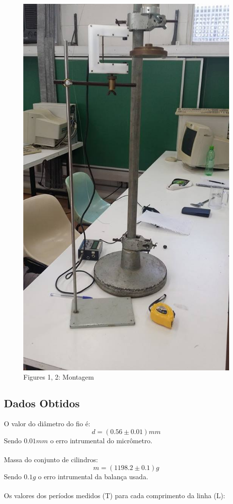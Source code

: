 \documentclass[12pt,a4paper]{article}
\begin{document}
\begin{figure}[!htbp]
	\includegraphics[scale=0.30]{02.jpg}\\
	Figures 1, 2: Montagem
\end{figure}

\subsection{Dados Obtidos}
O valor do diâmetro do fio é:
$$ d = (0.56 \pm 0.01) mm $$
Sendo $0.01 mm$ o erro intrumental do micrômetro.\\\\
Massa do conjunto de cilindros:
$$ m = (1198.2 \pm 0.1) g $$
Sendo $0.1 g$ o erro intrumental da balança usada.\\\\
Os valores dos períodos medidos (T) para cada comprimento da linha (L):
\end{document}
